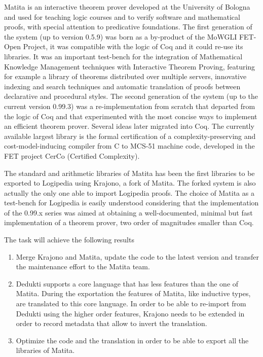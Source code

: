 


Matita is an interactive theorem prover developed at the University of Bologna and used for teaching logic courses and to verify software and mathematical proofs, with special attention to predicative foundations. The first generation of the system (up to version 0.5.9) was born as a by-product of the MoWGLI FET-Open Project, it was compatible with the logic of Coq and it could re-use its libraries. It was an important test-bench for the integration of Mathematical Knowledge Management techniques with Interactive Theorem Proving, featuring for example a library of theorems distributed over multiple servers, innovative indexing and search techniques and automatic translation of proofs between declarative and procedural styles. The second generation of the system (up to the current version 0.99.3) was a re-implementation from scratch that departed from the logic of Coq and that experimented with the most concise ways to implement an efficient theorem prover. Several ideas later migrated into Coq. The currently available largest library is the formal certification of a complexity-preserving and cost-model-inducing compiler from C to MCS-51 machine code, developed in the FET project CerCo (Certified Complexity).

The standard and arithmetic libraries of Matita has been the first libraries to be exported to Logipedia using Krajono, a fork of Matita. The forked system is also actually the only one able to import Logipedia proofs. The choice of Matita as a test-bench for Logipedia is easily understood considering that the implementation of the 0.99.x series was aimed at obtaining a well-documented, minimal but fast implementation of a theorem prover, two order of magnitudes smaller than Coq.

The task will achieve the following results
\begin{enumerate}
\item Merge Krajono and Matita, update the code to the latest version and transfer the maintenance effort to the Matita team.
\item Dedukti supports a core language that has less features than the one of Matita. During the exportation the features of Matita, like inductive types, are translated to this core language. In order to be able to re-import from Dedukti using the higher order features, Krajono needs to be extended in order to record metadata that allow to invert the translation.
\item Optimize the code and the translation in order to be able to export all the libraries of Matita.
\end{enumerate}

